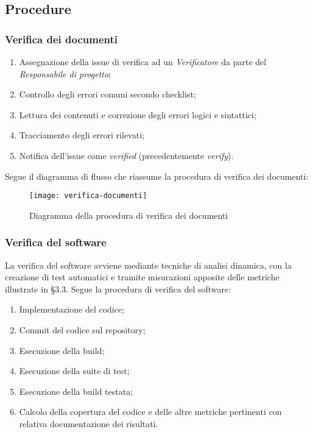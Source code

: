 \documentclass[../NormediProgetto.tex]{subfiles}
\begin{document}
\subsection{Procedure}

\subsubsection{Verifica dei documenti}

\begin{enumerate}
	\item Assegnazione della issue di verifica ad un \textit{Verificatore} da parte del \textit{Responsabile di progetto};
	
	\item Controllo degli errori comuni secondo checklist;
	
	\item Lettura dei contenuti e correzione degli errori logici e sintattici;
	
	\item Tracciamento degli errori rilevati;
	
	\item Notifica dell'issue come \textit{verified} (precedentemente \textit{verify}).
\end{enumerate}

Segue il diagramma di flusso che riassume la procedura di verifica dei documenti:

\begin{figure}[H]
	\texttt{[image: verifica-documenti]}
	\centering
	\caption{Diagramma della procedura di verifica dei documenti}
\end{figure}

\subsubsection{Verifica del software}

La verifica del software avviene mediante tecniche di analisi dinamica, con la creazione di test automatici e tramite misurazioni apposite delle metriche illustrate in §3.3. Segue la procedura di verifica del software:

\begin{enumerate}
	\item Implementazione del codice;
	
	\item Commit del codice sul repository;
	
	\item Esecuzione della build;
	
	\item Esecuzione della suite di test;
	
	\item Esecuzione della build testata;
	
	\item Calcolo della copertura del codice e delle altre metriche pertinenti con relativa documentazione dei risultati.
\end{enumerate}
\end{document}
